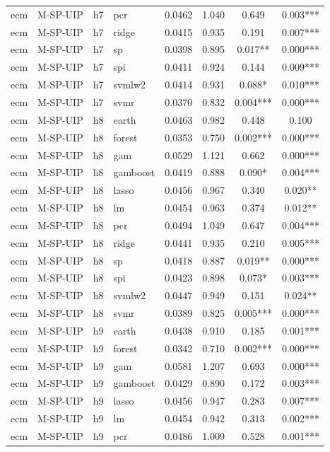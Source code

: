 \begin{ThreePartTable}
\begin{longtable}[t]{llclcccc}
ecm & M-SP-UIP & h7 & pcr & 0.0462 & 1.040 & 0.649 & 0.003***\\
ecm & M-SP-UIP & h7 & ridge & 0.0415 & 0.935 & 0.191 & 0.007***\\
ecm & M-SP-UIP & h7 & sp & 0.0398 & 0.895 & 0.017** & 0.000***\\
ecm & M-SP-UIP & h7 & spi & 0.0411 & 0.924 & 0.144 & 0.009***\\
ecm & M-SP-UIP & h7 & svmlw2 & 0.0414 & 0.931 & 0.088* & 0.010***\\
ecm & M-SP-UIP & h7 & svmr & 0.0370 & 0.832 & 0.004*** & 0.000***\\
\addlinespace
ecm & M-SP-UIP & h8 & earth & 0.0463 & 0.982 & 0.448 & 0.100\\
ecm & M-SP-UIP & h8 & forest & 0.0353 & 0.750 & 0.002*** & 0.000***\\
ecm & M-SP-UIP & h8 & gam & 0.0529 & 1.121 & 0.662 & 0.000***\\
ecm & M-SP-UIP & h8 & gamboost & 0.0419 & 0.888 & 0.090* & 0.004***\\
ecm & M-SP-UIP & h8 & lasso & 0.0456 & 0.967 & 0.340 & 0.020**\\
ecm & M-SP-UIP & h8 & lm & 0.0454 & 0.963 & 0.374 & 0.012**\\
ecm & M-SP-UIP & h8 & pcr & 0.0494 & 1.049 & 0.647 & 0.004***\\
ecm & M-SP-UIP & h8 & ridge & 0.0441 & 0.935 & 0.210 & 0.005***\\
ecm & M-SP-UIP & h8 & sp & 0.0418 & 0.887 & 0.019** & 0.000***\\
ecm & M-SP-UIP & h8 & spi & 0.0423 & 0.898 & 0.073* & 0.003***\\
ecm & M-SP-UIP & h8 & svmlw2 & 0.0447 & 0.949 & 0.151 & 0.024**\\
ecm & M-SP-UIP & h8 & svmr & 0.0389 & 0.825 & 0.005*** & 0.000***\\
\addlinespace
ecm & M-SP-UIP & h9 & earth & 0.0438 & 0.910 & 0.185 & 0.001***\\
ecm & M-SP-UIP & h9 & forest & 0.0342 & 0.710 & 0.002*** & 0.000***\\
ecm & M-SP-UIP & h9 & gam & 0.0581 & 1.207 & 0.693 & 0.000***\\
ecm & M-SP-UIP & h9 & gamboost & 0.0429 & 0.890 & 0.172 & 0.003***\\
ecm & M-SP-UIP & h9 & lasso & 0.0456 & 0.947 & 0.283 & 0.007***\\
ecm & M-SP-UIP & h9 & lm & 0.0454 & 0.942 & 0.313 & 0.002***\\
ecm & M-SP-UIP & h9 & pcr & 0.0486 & 1.009 & 0.528 & 0.001***\\

\end{longtable}
\end{ThreePartTable}
